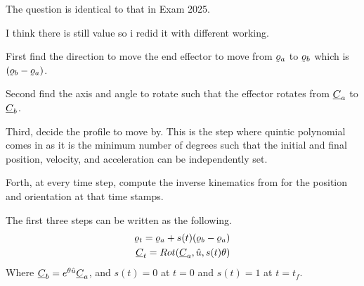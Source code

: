 \begin{solutionbox}[Q1-3]

    The question is identical to that in Exam 2025.

    I think there is still value so i redid it with different working.

    First find the direction to move the end effector to move from $\ppori{a}$ to $\ppori{b}$ which is $(\ppori{b}-\ppori{a})$.

    Second find the axis and angle to rotate such that the effector rotates from $\underline{C}_a$ to $\underline{C}_b$.

    Third, decide the profile to move by. This is the step where quintic polynomial comes in as it is the minimum number of degrees such that the initial and final position, velocity, and acceleration can be independently set.

    Forth, at every time step, compute the inverse kinematics from for the position and orientation at that time stamps.

    The first three steps can be written as the following.
    \begin{align*}
        \ppori{t} = \ppori{a} + s(t) (\ppori{b}-\ppori{a}) \\
        \pc{C}_t = Rot(\pc{C}_a,\hat{u},s(t)\theta)        \\
    \end{align*}
    Where $\underline{C}_b = e^{\theta \hat{u}} \underline{C}_a$, and $s(t)=0$ at $t=0$ and $s(t)=1$ at $t=t_f$.

\end{solutionbox}

